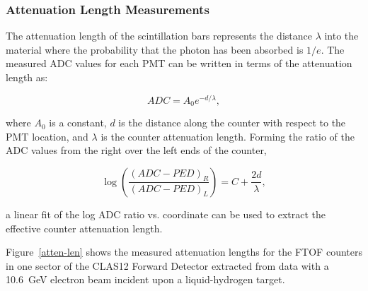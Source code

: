 \documentclass{elsart}
\begin{document}
\subsubsection{Attenuation Length Measurements}
\label{sec:attlen}

The attenuation length of the scintillation bars represents the distance $\lambda$ into the material
where the probability that the photon has been absorbed is $1/e$. The measured ADC values for each
PMT can be written in terms of the attenuation length as:

\begin{equation}
\label{al-adc}
ADC = A_0 e^{-d/\lambda},
\end{equation}

\noindent
where $A_0$ is a constant, $d$ is the distance along the counter with respect to the PMT location, and
$\lambda$ is the counter attenuation length. Forming the ratio of the ADC values from the right over
the left ends of the counter,

\begin{equation}
\label{linear}
\log \left( \frac{(ADC-PED)_R}{(ADC-PED)_L} \right ) = C + \frac{2d}{\lambda},
\end{equation}

\noindent
a linear fit of the log ADC ratio vs. coordinate can be used to extract the effective counter attenuation
length. 

Figure~\ref{atten-len} shows the measured attenuation lengths for the FTOF counters in one sector of
the CLAS12 Forward Detector extracted from data with a 10.6~GeV electron beam incident upon a
liquid-hydrogen target.
\end{document}
